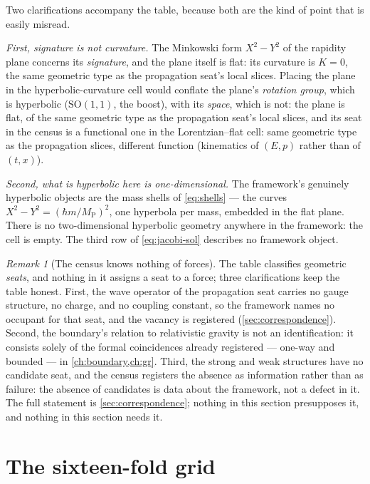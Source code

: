 \documentclass[11pt]{amsbook}
\theoremstyle{plain}
\theoremstyle{definition}
\theoremstyle{remark}
\newtheorem{remark}[theorem]{Remark}
\begin{document}
Two clarifications accompany the table, because both are the kind of point that is easily misread.

\emph{First, signature is not curvature.} The Minkowski form $X^{2} - Y^{2}$ of the rapidity plane concerns its \emph{signature}, and the plane itself is flat: its curvature is $K = 0$, the same geometric type as the propagation seat's local slices. Placing the plane in the hyperbolic-curvature cell would conflate the plane's \emph{rotation group}, which is hyperbolic ($\mathrm{SO}(1,1)$, the boost), with its \emph{space}, which is not: the plane is flat, of the same geometric type as the propagation seat's local slices, and its seat in the census is a functional one in the Lorentzian--flat cell: same geometric type as the propagation slices, different function (kinematics of $(E, p)$ rather than of $(t, x)$).

\emph{Second, what is hyperbolic here is one-dimensional.} The framework's genuinely hyperbolic objects are the mass shells of \cref{eq:shells} --- the curves $X^{2} - Y^{2} = (\hbar m/M_{\mathrm P})^{2}$, one hyperbola per mass, embedded in the flat plane. There is no two-dimensional hyperbolic geometry anywhere in the framework: the cell is empty. The third row of \cref{eq:jacobi-sol} describes no framework object.

\begin{remark}[The census knows nothing of forces]\label{rem:no-forces-here}
The table classifies geometric \emph{seats}, and nothing in it assigns a seat to a force; three clarifications keep the table honest. First, the wave operator of the propagation seat carries no gauge structure, no charge, and no coupling constant, so the framework names no occupant for that seat, and the vacancy is registered (\cref{sec:correspondence}). Second, the boundary's relation to relativistic gravity is not an identification: it consists solely of the formal coincidences already registered --- one-way and bounded --- in \cref{ch:boundary,ch:gr}. Third, the strong and weak structures have no candidate seat, and the census registers the absence as information rather than as failure: the absence of candidates is data about the framework, not a defect in it. The full statement is \cref{sec:correspondence}; nothing in this section presupposes it, and nothing in this section needs it.
\end{remark}

\section{The sixteen-fold grid}\label{sec:sixteen}
\end{document}
